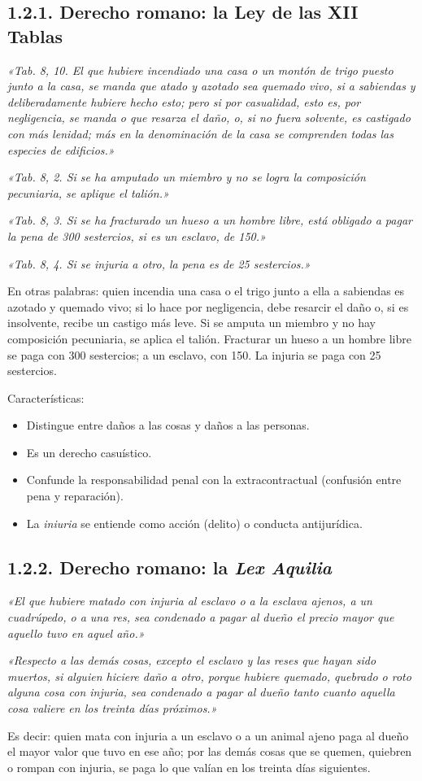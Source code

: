 \subsection{1.2.1. Derecho romano: la Ley de las XII Tablas}
\begin{cita}
\textit{«Tab. 8, 10. El que hubiere incendiado una casa o un montón de trigo puesto junto a la casa, se manda que atado y azotado sea quemado vivo, si a sabiendas y deliberadamente hubiere hecho esto; pero si por casualidad, esto es, por negligencia, se manda o que resarza el daño, o, si no fuera solvente, es castigado con más lenidad; más en la denominación de la casa se comprenden todas las especies de edificios.»}
\par
\textit{«Tab. 8, 2. Si se ha amputado un miembro y no se logra la composición pecuniaria, se aplique el talión.»}
\par
\textit{«Tab. 8, 3. Si se ha fracturado un hueso a un hombre libre, está obligado a pagar la pena de 300 sestercios, si es un esclavo, de 150.»}
\par
\textit{«Tab. 8, 4. Si se injuria a otro, la pena es de 25 sestercios.»}
\end{cita}
En otras palabras: quien incendia una casa o el trigo junto a ella a sabiendas es azotado y quemado vivo; si lo hace por negligencia, debe resarcir el daño o, si es insolvente, recibe un castigo más leve. Si se amputa un miembro y no hay composición pecuniaria, se aplica el talión. Fracturar un hueso a un hombre libre se paga con 300 sestercios; a un esclavo, con 150. La injuria se paga con 25 sestercios.

Características:

\begin{itemize}
\item Distingue entre daños a las cosas y daños a las personas.
\item Es un derecho casuístico.
\item Confunde la responsabilidad penal con la extracontractual (confusión entre pena y reparación).
\item La \textit{iniuria} se entiende como acción (delito) o conducta antijurídica.
\end{itemize}
\subsection{1.2.2. Derecho romano: la \textit{Lex Aquilia}}
\begin{cita}
\textit{«El que hubiere matado con injuria al esclavo o a la esclava ajenos, a un cuadrúpedo, o a una res, sea condenado a pagar al dueño el precio mayor que aquello tuvo en aquel año.»}
\par
\textit{«Respecto a las demás cosas, excepto el esclavo y las reses que hayan sido muertos, si alguien hiciere daño a otro, porque hubiere quemado, quebrado o roto alguna cosa con injuria, sea condenado a pagar al dueño tanto cuanto aquella cosa valiere en los treinta días próximos.»}
\end{cita}
Es decir: quien mata con injuria a un esclavo o a un animal ajeno paga al dueño el mayor valor que tuvo en ese año; por las demás cosas que se quemen, quiebren o rompan con injuria, se paga lo que valían en los treinta días siguientes.

